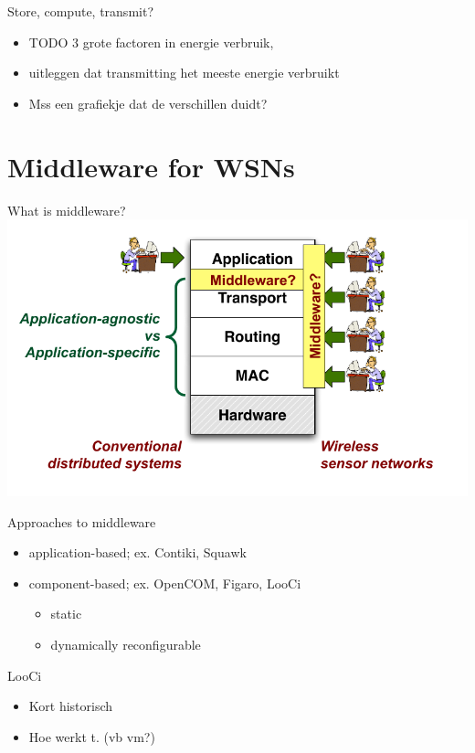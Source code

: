 \documentclass[presentation, bigger]{beamer}
\begin{document}
\begin{frame}[label=sec-1-5]{Store, compute, transmit?}
\begin{itemize}
\item TODO 3 grote factoren in energie verbruik,
\item uitleggen dat transmitting het meeste energie verbruikt
\item Mss een grafiekje dat de verschillen duidt?
\end{itemize}
\end{frame}
\section{Middleware for WSNs}
\label{sec-2}
\begin{frame}[label=sec-2-1]{What is middleware?}
\includegraphics[width=\textwidth,keepaspectration=true]{middleware}
\end{frame}

\begin{frame}[label=sec-2-2]{Approaches to middleware}
\begin{itemize}
\item application-based; ex. Contiki, Squawk
\item component-based; ex. OpenCOM, Figaro, LooCi
\begin{itemize}
\item static
\item dynamically reconfigurable
\end{itemize}
\end{itemize}
\end{frame}

\begin{frame}[label=sec-2-3]{LooCi}
\begin{itemize}
\item Kort historisch
\item Hoe werkt t. (vb vm?)
\end{itemize}
\end{frame}
\end{document}
